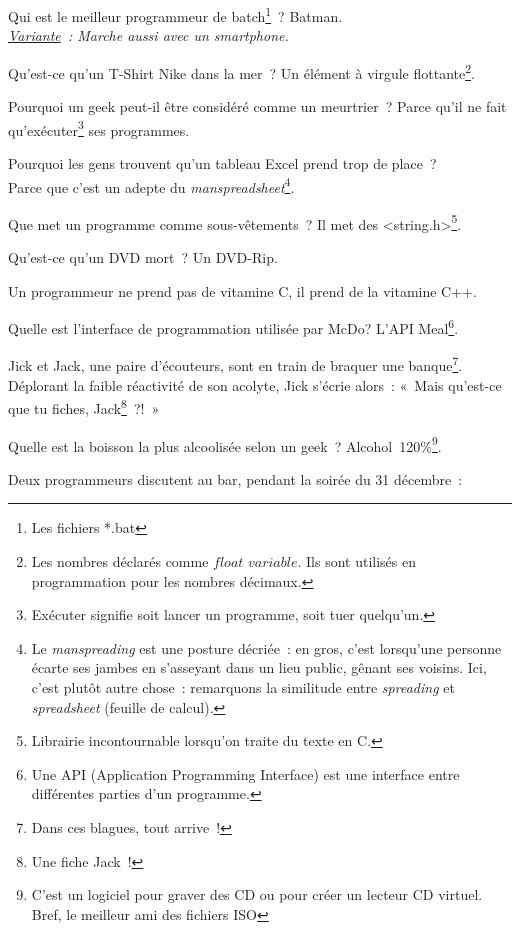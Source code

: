\documentclass[10pt,a5paper,fullpage]{book}
\begin{document}
\begin{enumerate}
{		\item Qui est le meilleur programmeur de batch\footnote{Les fichiers *.bat}~? Batman.
		\\\textit{\underline{Variante}~: Marche aussi avec un smartphone.} 
		\item Qu’est-ce qu’un T-Shirt Nike dans la mer~? Un élément à virgule flottante\footnote{Les nombres déclarés comme $\textit{float variable}$. Ils sont utilisés en programmation pour les nombres décimaux.}.
		\item Pourquoi un geek peut-il être considéré comme un meurtrier~? Parce qu’il ne fait qu’exécuter\footnote{Exécuter signifie soit lancer un programme, soit tuer quelqu'un.} ses programmes.
		\item Pourquoi les gens trouvent qu'un tableau Excel prend trop de place~? \\Parce que c'est un adepte du \textit{manspreadsheet}\footnote{Le \textit{manspreading} est une posture décriée~: en gros, c'est lorsqu'une personne écarte ses jambes en s'asseyant dans un lieu public, gênant ses voisins. Ici, c'est plutôt autre chose~: remarquons la similitude entre \textit{spreading} et \textit{spreadsheet} (feuille de calcul).}. 
		\item Que met un programme comme sous-vêtements~? Il met des <string.h>\footnote{Librairie incontournable lorsqu'on traite du texte en C.}.
		\item Qu’est-ce qu’un DVD mort~? Un DVD-Rip.
		\item Un programmeur ne prend pas de vitamine C, il prend de la vitamine C++.
		\item Quelle est l'interface de programmation utilisée par McDo? L'API Meal\footnote{Une API (Application Programming Interface) est une interface entre différentes parties d'un programme.}.
		\item Jick et Jack, une paire d’écouteurs, sont en train de braquer une banque\footnote{Dans ces blagues, tout arrive~!}. Déplorant la faible réactivité de son acolyte, Jick s’écrie alors~: «~Mais qu’est-ce que tu fiches, Jack\footnote{Une fiche Jack~!}~?!~»
		\item Quelle est la boisson la plus alcoolisée selon un geek~? Alcohol~120\%\footnote{C’est un logiciel pour graver des CD ou pour créer un lecteur CD virtuel. \\Bref, le meilleur ami des fichiers ISO}.
		\item Deux programmeurs discutent au bar, pendant la soirée du 31 décembre~:
}
\end{enumerate}
\end{document}
